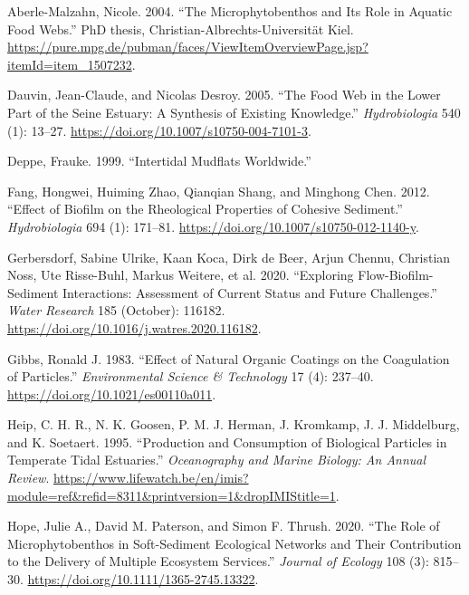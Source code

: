 \documentclass[
  letterpaper,
  DIV=11,
  numbers=noendperiod]{scrartcl}
\newlength{\cslhangindent}
\newenvironment{CSLReferences}[2] %
 {\begin{list}{}{%
  \setlength{\itemindent}{0pt}
  \setlength{\leftmargin}{0pt}
  \setlength{\parsep}{0pt}
  \ifodd #1
   \setlength{\leftmargin}{\cslhangindent}
   \setlength{\itemindent}{-1\cslhangindent}
  \fi
  \setlength{\itemsep}{#2\baselineskip}}}
 {\end{list}}
\begin{document}
\label{refs}
\begin{CSLReferences}{1}{0}
Aberle-Malzahn, Nicole. 2004. {``The Microphytobenthos and Its Role in
Aquatic Food Webs.''} PhD thesis, Christian-Albrechts-Universität Kiel.
\url{https://pure.mpg.de/pubman/faces/ViewItemOverviewPage.jsp?itemId=item_1507232}.

Dauvin, Jean-Claude, and Nicolas Desroy. 2005. {``The Food Web in the
Lower Part of the {Seine} Estuary: A Synthesis of Existing Knowledge.''}
\emph{Hydrobiologia} 540 (1): 13--27.
\url{https://doi.org/10.1007/s10750-004-7101-3}.

Deppe, Frauke. 1999. {``Intertidal {Mudflats} {Worldwide}.''}

Fang, Hongwei, Huiming Zhao, Qianqian Shang, and Minghong Chen. 2012.
{``Effect of Biofilm on the Rheological Properties of Cohesive
Sediment.''} \emph{Hydrobiologia} 694 (1): 171--81.
\url{https://doi.org/10.1007/s10750-012-1140-y}.

Gerbersdorf, Sabine Ulrike, Kaan Koca, Dirk de Beer, Arjun Chennu,
Christian Noss, Ute Risse-Buhl, Markus Weitere, et al. 2020.
{``Exploring Flow-Biofilm-Sediment Interactions: {Assessment} of Current
Status and Future Challenges.''} \emph{Water Research} 185 (October):
116182. \url{https://doi.org/10.1016/j.watres.2020.116182}.

Gibbs, Ronald J. 1983. {``Effect of Natural Organic Coatings on the
Coagulation of Particles.''} \emph{Environmental Science \& Technology}
17 (4): 237--40. \url{https://doi.org/10.1021/es00110a011}.

Heip, C. H. R., N. K. Goosen, P. M. J. Herman, J. Kromkamp, J. J.
Middelburg, and K. Soetaert. 1995. {``Production and Consumption of
Biological Particles in Temperate Tidal Estuaries.''} \emph{Oceanography
and Marine Biology: An Annual Review}.
\url{https://www.lifewatch.be/en/imis?module=ref&refid=8311&printversion=1&dropIMIStitle=1}.

Hope, Julie A., David M. Paterson, and Simon F. Thrush. 2020. {``The
Role of Microphytobenthos in Soft-Sediment Ecological Networks and Their
Contribution to the Delivery of Multiple Ecosystem Services.''}
\emph{Journal of Ecology} 108 (3): 815--30.
\url{https://doi.org/10.1111/1365-2745.13322}.


\end{CSLReferences}
\end{document}
